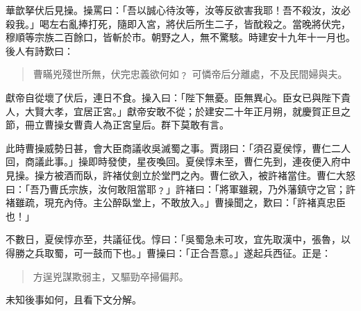 華歆拏伏后見操。操罵曰：「吾以誠心待汝等，汝等反欲害我耶！吾不殺汝，汝必殺我。」喝左右亂捧打死，隨即入宮，將伏后所生二子，皆酖殺之。當晚將伏完，穆順等宗族二百餘口，皆斬於市。朝野之人，無不驚駭。時建安十九年十一月也。後人有詩歎曰：

\begin{quote}
曹瞞兇殘世所無，伏完忠義欲何如﹖
可憐帝后分離處，不及民間婦與夫。
\end{quote}

獻帝自從壞了伏后，連日不食。操入曰：「陛下無憂。臣無異心。臣女已與陛下貴人，大賢大孝，宜居正宮。」獻帝安敢不從；於建安二十年正月朔，就慶賀正旦之節，冊立曹操女曹貴人為正宮皇后。群下莫敢有言。

此時曹操威勢日甚，會大臣商議收吳滅蜀之事。賈詡曰：「須召夏侯惇，曹仁二人回，商議此事。」操即時發使，星夜喚回。夏侯惇未至，曹仁先到，連夜便入府中見操。操方被酒而臥，許褚仗劍立於堂門之內。曹仁欲入，被許褚當住。曹仁大怒曰：「吾乃曹氏宗族，汝何敢阻當耶﹖」許褚曰：「將軍雖親，乃外藩鎮守之官；許褚雖疏，現充內侍。主公醉臥堂上，不敢放入。」曹操聞之，歎曰：「許褚真忠臣也！」

不數日，夏侯惇亦至，共議征伐。惇曰：「吳蜀急未可攻，宜先取漢中，張魯，以得勝之兵取蜀，可一鼓而下也。」曹操曰：「正合吾意。」遂起兵西征。正是：

\begin{quote}
方逞兇謀欺弱主，又驅勁卒掃偏邦。
\end{quote}

未知後事如何，且看下文分解。
